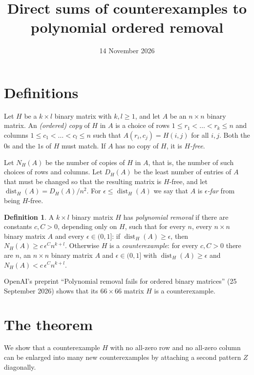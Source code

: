\documentclass[11pt]{article}
\title{Direct sums of counterexamples to polynomial ordered removal}
\author{}
\date{14 November 2026}
\DeclareMathOperator{\dist}{dist}
\theoremstyle{plain}
\theoremstyle{definition}
\newtheorem{definition}[theorem]{Definition}
\theoremstyle{remark}
\begin{document}
\maketitle

\section{Definitions}

Let $H$ be a $k \times l$ binary matrix with $k, l \ge 1$, and let $A$ be an $n \times n$ binary
matrix. An \emph{(ordered) copy} of $H$ in $A$ is a choice of rows
$1 \le r_1 < \dots < r_k \le n$ and columns $1 \le c_1 < \dots < c_l \le n$ such that
$A(r_i, c_j) = H(i,j)$ for all $i, j$. Both the $0$s and the $1$s of $H$ must match. If $A$ has
no copy of $H$, it is \emph{$H$-free}.

Let $N_H(A)$ be the number of copies of $H$ in $A$, that is, the number of such choices of rows
and columns. Let $D_H(A)$ be the least number of entries of $A$ that must be changed so that the
resulting matrix is $H$-free, and let $\dist_H(A) = D_H(A)/n^2$. For $\epsilon \le \dist_H(A)$
we say that $A$ is \emph{$\epsilon$-far} from being $H$-free.

\begin{definition}
A $k \times l$ binary matrix $H$ has \emph{polynomial removal} if there are constants
$c, C > 0$, depending only on $H$, such that for every $n$, every $n \times n$ binary matrix
$A$ and every $\epsilon \in (0,1]$: if $\dist_H(A) \ge \epsilon$, then
$N_H(A) \ge c\,\epsilon^C n^{k+l}$. Otherwise $H$ is a \emph{counterexample}: for every
$c, C > 0$ there are $n$, an $n \times n$ binary matrix $A$ and $\epsilon \in (0,1]$ with
$\dist_H(A) \ge \epsilon$ and $N_H(A) < c\,\epsilon^C n^{k+l}$.
\end{definition}

OpenAI's preprint ``Polynomial removal fails for ordered binary matrices'' (25 September 2026)
shows that its $66 \times 66$ matrix $H$ is a counterexample.

\section{The theorem}

We show that a counterexample $H$ with no all-zero row and no all-zero column can be enlarged
into many new counterexamples by attaching a second pattern $Z$ diagonally.
\end{document}

